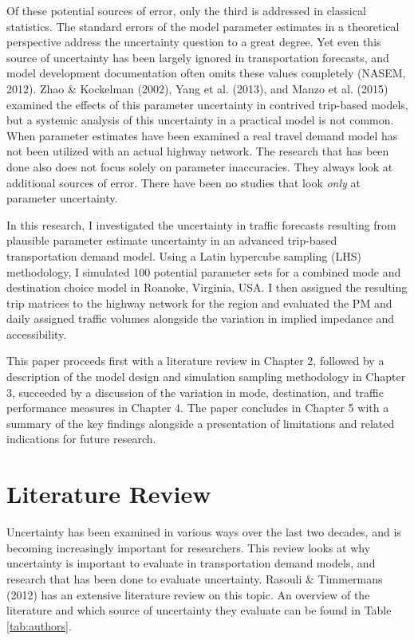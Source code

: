 \documentclass[fancy, masters, twoside]{byuthesis}
\begin{document}
Of these potential sources of error, only the third is addressed in classical statistics. The standard errors of the model parameter estimates in a theoretical perspective address the uncertainty question to a great degree. Yet even this source of uncertainty has been largely ignored in transportation forecasts, and model development documentation often omits these values completely (NASEM, 2012). Zhao \& Kockelman (2002), Yang et al. (2013), and Manzo et al. (2015) examined the effects of this parameter uncertainty in contrived trip-based models, but a systemic analysis of this uncertainty in a practical model is not common. When parameter estimates have been examined a real travel demand model has not been utilized with an actual highway network. The research that has been done also does not focus solely on parameter inaccuracies. They always look at additional sources of error. There have been no studies that look \emph{only} at parameter uncertainty.

In this research, I investigated the uncertainty in traffic forecasts resulting from plausible parameter estimate uncertainty in an advanced trip-based transportation demand model. Using a Latin hypercube sampling (LHS) methodology, I simulated 100 potential parameter sets for a combined mode and destination choice model in Roanoke, Virginia, USA. I then assigned the resulting trip matrices to the highway network for the region and evaluated the PM and daily assigned traffic volumes alongside the variation in implied impedance and accessibility.

This paper proceeds first with a literature review in Chapter 2, followed by a description of the model design and simulation sampling methodology in Chapter 3, succeeded by a discussion of the variation in mode, destination, and traffic performance measures in Chapter 4. The paper concludes in Chapter 5 with a summary of the key findings alongside a presentation of limitations and related indications for future research.

\hypertarget{literature-review}{%
\chapter{Literature Review}\label{literature-review}}

Uncertainty has been examined in various ways over the last two decades, and is becoming increasingly important for researchers. This review looks at why uncertainty is important to evaluate in transportation demand models, and research that has been done to evaluate uncertainty. Rasouli \& Timmermans (2012) has an extensive literature review on this topic. An overview of the literature and which source of uncertainty they evaluate can be found in Table \ref{tab:authors}.
\end{document}
